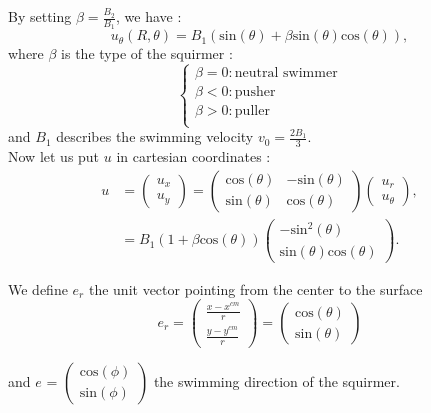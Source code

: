 \documentclass{article}
\begin{document}
By setting $\beta=\frac{B_2}{B_1}$, we have :
$$
u_\theta(R,\theta) = B_1(\mathrm{sin}(\theta) + \beta \mathrm{sin}(\theta)\mathrm{cos}(\theta)),
$$
where $\beta$ is the type of the squirmer :
$$\left\{
    \begin{array}{ll}
        \beta = 0 : \text{neutral swimmer}  \\
        \beta < 0 : \mathrm{pusher} \\
        \beta > 0 : \mathrm{puller} \\
    \end{array}
\right.$$
and $B_1$ describes the swimming velocity $v_0 = \frac{2 B_1}{3}$.
\\ Now let us put $u$ in cartesian coordinates :
\begin{align*}
    u &= \begin{pmatrix}
   u_x \\
   u_y
\end{pmatrix}
= \begin{pmatrix}
   \mathrm{cos}(\theta) & -\mathrm{sin}(\theta) \\
   \mathrm{sin}(\theta) & \mathrm{cos}(\theta)
\end{pmatrix}
\begin{pmatrix}
   u_r \\
   u_\theta
\end{pmatrix}, \\
&= B_1 (1 + \beta \mathrm{cos}(\theta))
\begin{pmatrix}
   -\mathrm{sin}^2(\theta) \\
   \mathrm{sin}(\theta)\mathrm{cos}(\theta)
\end{pmatrix}.
\end{align*}

We define $e_r$ the unit vector pointing from the center to the surface 
$$
e_r = \begin{pmatrix}
   \frac{x - x^{cm}}{r}  \\
   \frac{y - y^{cm}}{r} 
\end{pmatrix} = \begin{pmatrix}
   \mathrm{cos}(\theta) \\
   \mathrm{sin}(\theta)
\end{pmatrix}$$ 

and $e$ = 
$\begin{pmatrix}
   \mathrm{cos}(\phi) \\
   \mathrm{sin}(\phi) \end{pmatrix}$ the swimming direction of the squirmer. 
   
\end{document}
